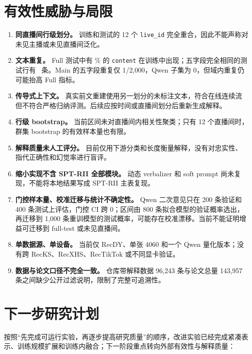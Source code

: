 \documentclass[UTF8,zihao=-4,a4paper]{ctexart}
\begin{document}
\section{有效性威胁与局限}

\begin{enumerate}[leftmargin=2em,label=\arabic*.]
  \item \textbf{同直播间行级划分。} 训练和测试的 12 个 \texttt{live\_id} 完全重合，因此不能声称对未见主播或未见直播间泛化。
  \item \textbf{文本重复。} Full 测试中有 \ContentOverlapPct\% 的 \texttt{content} 在训练中出现；五字段完全相同的测试行有 \ExactOverlapRows\ 条。Main 的五字段重复仅 1/2,000，Qwen 子集为 0，但域内重复仍可能抬高 Full 指标。
  \item \textbf{传导式上下文。} 真实前文重建使用另一划分的未标注文本，符合在线连续流但不符合严格归纳评测。后续应按时间或直播间划分后重新生成解释。
  \item \textbf{行级 bootstrap。} 当前区间未对直播间内相关性聚类；只有 12 个直播间时，群集 bootstrap 的有效样本量也有限。
  \item \textbf{解释质量未人工评分。} 目前仅用下游分类和长度衡量解释，没有对忠实性、指代正确性和幻觉率进行盲评。
  \item \textbf{缩小实现不含 SPT-RII 全部模块。} 动态 verbalizer 和 soft prompt 尚未复现，不能将本地结果写成 SPT-RII 主表复现。
  \item \textbf{门控样本量、校准迁移与统计不确定性。} Qwen 二次意见只在 200 条验证和 400 条测试上评估，门控 CI 跨 0；区间由 800 条拟合模型的验证概率选出，再迁移到 1,000 条重训模型的测试概率，可能存在校准漂移。当前不能证明增益可迁移到 full-test 或未见直播间。
  \item \textbf{单数据源、单设备。} 当前仅 RecDY、单张 4060 和一个 Qwen 量化版本；没有跨 RecKS、RecXHS、RecTikTok 或不同显卡验证。
  \item \textbf{数据与论文口径不完全一致。} 仓库带解释数据 96,243 条与论文总量 143,957 条之间缺少公开过滤说明，限制了完整可追溯性。
\end{enumerate}

\section{下一步研究计划}

按照“先完成可运行实验，再逐步提高研究质量”的顺序，改进实验已经完成紧凑表示、训练规模扩展和训练内融合；下一阶段重点转向外部有效性与解释质量：
\end{document}
